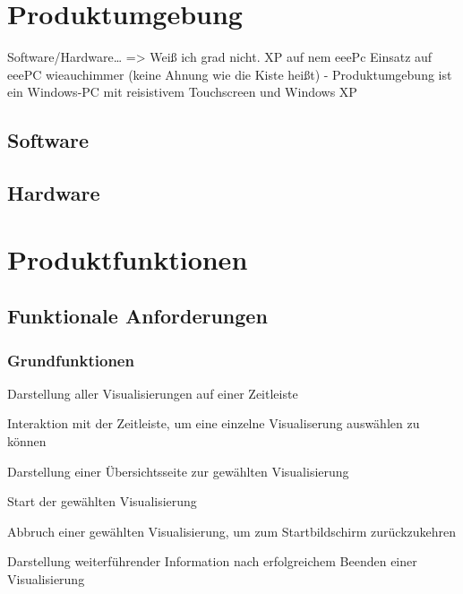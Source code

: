 \documentclass{article}
\begin{document}
\section{Produktumgebung}

Software/Hardware… => Weiß ich grad nicht. XP auf nem eeePc
Einsatz auf eeePC wieauchimmer (keine Ahnung wie die Kiste heißt)
- Produktumgebung ist ein Windows-PC mit reisistivem Touchscreen 
und Windows XP

\subsection{Software}

\subsection{Hardware}

\section{Produktfunktionen}

\subsection{Funktionale Anforderungen}

\subsubsection{Grundfunktionen}

\begin{FA}[start=100]
\item Darstellung aller Visualisierungen auf einer Zeitleiste
\item Interaktion mit der Zeitleiste, um eine einzelne Visualiserung auswählen zu können
\item Darstellung einer Übersichtsseite zur gewählten Visualisierung
\item Start der gewählten Visualisierung
\item Abbruch einer gewählten Visualisierung, um zum Startbildschirm zurückzukehren
\item Darstellung weiterführender Information nach erfolgreichem Beenden einer Visualisierung
\end{FA}

\end{document}
